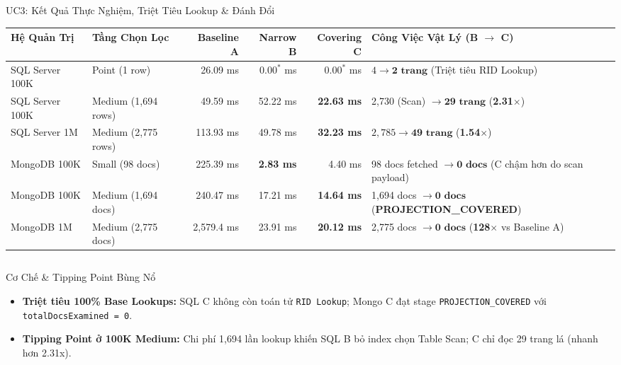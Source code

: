 \documentclass[aspectratio=169,9pt]{beamer}
\begin{document}
\begin{frame}{UC3: Kết Quả Thực Nghiệm, Triệt Tiêu Lookup \& Đánh Đổi}
\begin{table}
\centering\footnotesize
\begin{tabularx}{\linewidth}{@{}l l r r r X@{}}
\toprule
\textbf{Hệ Quản Trị} & \textbf{Tầng Chọn Lọc} & \textbf{Baseline A} & \textbf{Narrow B} & \textbf{Covering C} & \textbf{Công Việc Vật Lý (B $\to$ C)} \\
\midrule
SQL Server 100K & Point (1 row) & 26.09 ms & 0.00$^*$ ms & 0.00$^*$ ms & $4 \to \mathbf{2\text{ trang}}$ (Triệt tiêu RID Lookup) \\
SQL Server 100K & Medium (1,694 rows) & 49.59 ms & 52.22 ms & \textbf{22.63 ms} & 2,730 (Scan) $\to \mathbf{29\text{ trang}}$ (\textbf{2.31$\times$}) \\
SQL Server 1M & Medium (2,775 rows) & 113.93 ms & 49.78 ms & \textbf{32.23 ms} & $2,785 \to \mathbf{49\text{ trang}}$ (\textbf{1.54$\times$}) \\
\midrule
MongoDB 100K & Small (98 docs) & 225.39 ms & \textbf{2.83 ms} & 4.40 ms & 98 docs fetched $\to \mathbf{0\text{ docs}}$ (C chậm hơn do scan payload) \\
MongoDB 100K & Medium (1,694 docs) & 240.47 ms & 17.21 ms & \textbf{14.64 ms} & 1,694 docs $\to \mathbf{0\text{ docs}}$ (\textbf{PROJECTION\_COVERED}) \\
MongoDB 1M & Medium (2,775 docs) & 2,579.4 ms & 23.91 ms & \textbf{20.12 ms} & 2,775 docs $\to \mathbf{0\text{ docs}}$ (\textbf{128$\times$} vs Baseline A) \\
\bottomrule
\end{tabularx}
\end{table}

\vspace{-0.2cm}
\begin{columns}[T]
\begin{column}{0.48\textwidth}
\begin{block}{Cơ Chế \& Tipping Point Bùng Nổ}
\scriptsize
\begin{itemize}
  \item \textbf{Triệt tiêu 100\% Base Lookups:} SQL C không còn toán tử \texttt{RID Lookup}; Mongo C đạt stage \texttt{PROJECTION\_COVERED} với \texttt{totalDocsExamined = 0}.
  \item \textbf{Tipping Point ở 100K Medium:} Chi phí 1,694 lần lookup khiến SQL B bỏ index chọn Table Scan; C chỉ đọc 29 trang lá (nhanh hơn 2.31x).
\end{itemize}
\end{block}
\end{column}


\end{columns}
\end{frame}
\end{document}
